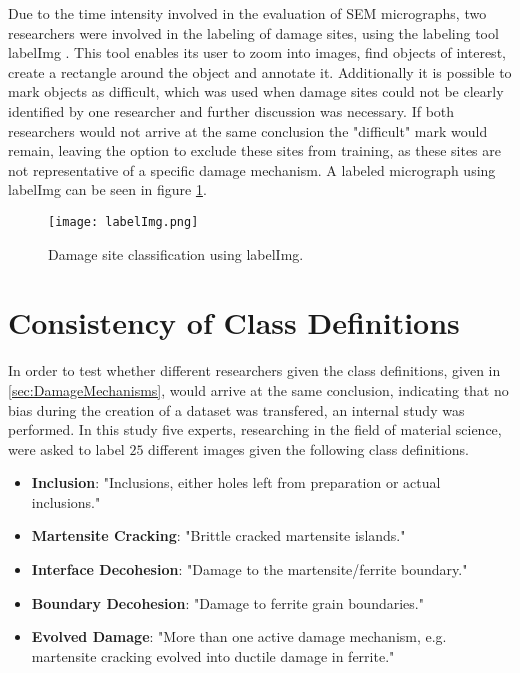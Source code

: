 Due to the time intensity involved in the evaluation of SEM micrographs, two researchers were involved in the labeling of damage sites, using the labeling tool labelImg \cite{labelImg}. This tool enables its user to zoom into images, find objects of interest, create a rectangle around the object and annotate it. Additionally it is possible to mark objects as difficult, which was used when damage sites could not be clearly identified by one researcher and further discussion was necessary. If both researchers would not arrive at the same conclusion the "difficult" mark would remain, leaving the option to exclude these sites from training, as these sites are not representative of a specific damage mechanism. A labeled micrograph using labelImg can be seen in figure \ref{fig:labelImg}. 

\begin{figure}[H]
\centering
\texttt{[image: labelImg.png]}
\caption{Damage site classification using labelImg.}
\label{fig:labelImg}
\end{figure}


\section{Consistency of Class Definitions}

In order to test whether different researchers given the class definitions, given in \ref{sec:DamageMechanisms}, would arrive at the same conclusion, indicating that no bias during the creation of a dataset was transfered, an internal study was performed. In this study five experts, researching in the field of material science, were asked to label $25$ different images given the following class definitions.\\

\begin{itemize}[label={}]
\item \textbf{Inclusion}: "Inclusions, either holes left from preparation or actual inclusions."
\item \textbf{Martensite Cracking}: "Brittle cracked martensite islands."
\item \textbf{Interface Decohesion}: "Damage to the martensite/ferrite boundary."
\item \textbf{Boundary Decohesion}: "Damage to ferrite grain boundaries."
\item \textbf{Evolved Damage}: "More than one active damage mechanism, e.g. martensite cracking evolved into ductile damage in ferrite."
\end{itemize}

